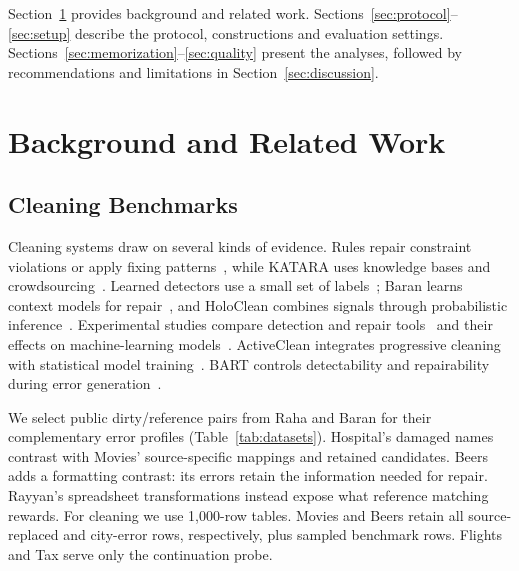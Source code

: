 \documentclass[sigconf, nonacm]{acmart}
\begin{document}
Section~\ref{sec:related} provides background and related work.
Sections~\ref{sec:protocol}--\ref{sec:setup} describe the protocol, constructions and evaluation
settings. Sections~\ref{sec:memorization}--\ref{sec:quality} present the analyses, followed by
recommendations and limitations in Section~\ref{sec:discussion}.

\section{Background and Related Work}\label{sec:related}

\subsection{Cleaning Benchmarks}\label{sec:benchmarks}

Cleaning systems draw on several kinds of evidence. Rules repair constraint violations or
apply fixing patterns~\cite{dallachiesa2013nadeef,chu2013holistic,wang2014fixing}, while KATARA
uses knowledge bases and crowdsourcing~\cite{chu2015katara}. Learned detectors use a small
set of labels~\cite{mahdavi2019raha,heidari2019holodetect,neutatz2019ed2}; Baran learns context
models for repair~\cite{mahdavi2020baran}, and HoloClean combines signals through probabilistic
inference~\cite{rekatsinas2017holoclean}. Experimental studies compare detection and repair
tools~\cite{abedjan2016detecting,ni2024repair} and their effects on machine-learning
models~\cite{li2021cleanml,abdelaal2023rein}. ActiveClean integrates progressive cleaning with
statistical model training~\cite{krishnan2016activeclean}. BART controls detectability and
repairability during error generation~\cite{arocena2015bart}.

We select public dirty/reference pairs from Raha and Baran for their complementary error
profiles (Table~\ref{tab:datasets}). Hospital's damaged names contrast with Movies' source-specific
mappings and retained candidates. Beers adds a formatting contrast: its errors retain the
information needed for repair. Rayyan's spreadsheet
transformations instead expose what reference matching rewards. For cleaning we use 1,000-row
tables. Movies and Beers retain all source-replaced and city-error rows, respectively, plus
sampled benchmark rows. Flights and Tax serve only the continuation probe.
\end{document}
